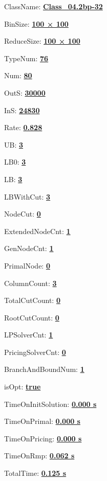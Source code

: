 \documentclass[11pt]{article}
\begin{document}
\pagestyle{empty}


ClassName: \underline{\textbf{Class_04.2bp-32}}
\par
BinSize: \underline{\textbf{100 × 100}}
\par
ReduceSize: \underline{\textbf{100 × 100}}
\par
TypeNum: \underline{\textbf{76}}
\par
Num: \underline{\textbf{80}}
\par
OutS: \underline{\textbf{30000}}
\par
InS: \underline{\textbf{24830}}
\par
Rate: \underline{\textbf{0.828}}
\par
UB: \underline{\textbf{3}}
\par
LB0: \underline{\textbf{3}}
\par
LB: \underline{\textbf{3}}
\par
LBWithCut: \underline{\textbf{3}}
\par
NodeCut: \underline{\textbf{0}}
\par
ExtendedNodeCnt: \underline{\textbf{1}}
\par
GenNodeCnt: \underline{\textbf{1}}
\par
PrimalNode: \underline{\textbf{0}}
\par
ColumnCount: \underline{\textbf{3}}
\par
TotalCutCount: \underline{\textbf{0}}
\par
RootCutCount: \underline{\textbf{0}}
\par
LPSolverCnt: \underline{\textbf{1}}
\par
PricingSolverCnt: \underline{\textbf{0}}
\par
BranchAndBoundNum: \underline{\textbf{1}}
\par
isOpt: \underline{\textbf{true}}
\par
TimeOnInitSolution: \underline{\textbf{0.000 s}}
\par
TimeOnPrimal: \underline{\textbf{0.000 s}}
\par
TimeOnPricing: \underline{\textbf{0.000 s}}
\par
TimeOnRmp: \underline{\textbf{0.062 s}}
\par
TotalTime: \underline{\textbf{0.125 s}}
\par
\newpage
\end{document}

